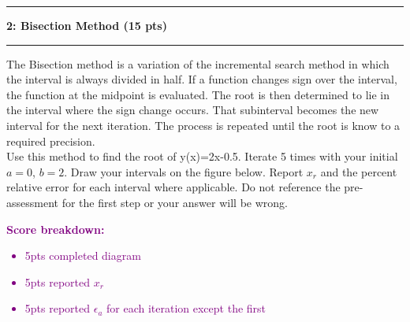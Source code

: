 \documentclass[11pt]{article}
\newcommand\question[2]{\vspace{.25in}\hrule\textbf{#1: #2}\vspace{.5em}\hrule\vspace{.10in}}
\begin{document}
\newpage
\question{2}{Bisection Method (15 pts)}
The Bisection method is a variation of the incremental search method in which the interval is always divided in half. If a function changes sign over the interval, the function at the midpoint is evaluated. The root is then determined to lie in the interval where the sign change occurs. That subinterval becomes the new interval for the next iteration. The process is repeated until the root is know to a required precision. 
\\\vspace{5pt}
Use this method to find the root of y(x)=2x-0.5. Iterate 5 times with your initial $a=0$, $b=2$. Draw your intervals on the figure below. Report $x_r$ and the percent relative error for each interval where applicable. Do not reference the pre-assessment for the first step or your answer will be wrong. \\
\vspace{4pt}
\textcolor{purple}{\textbf{Score breakdown:}
\begin{itemize}
	\item 5pts completed diagram
	\item 5pts reported $x_r$
	\item 5pts reported $\epsilon_a$ for each iteration except the first
\end{itemize}}
\end{document}
